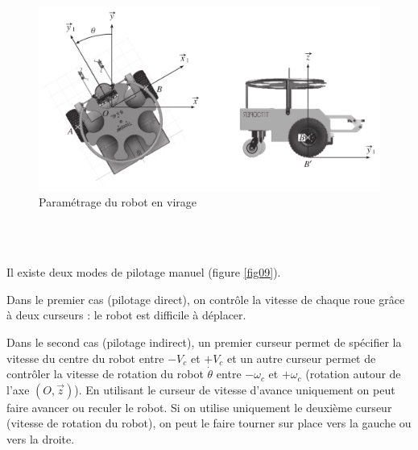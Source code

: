 \begin{figure}[ht!]
\begin{center}
 \includegraphics[width=0.7\linewidth]{img/fig08}
\end{center}
\caption{Paramétrage du robot en virage}
\label{fig08}
\end{figure}



~\ \\ ~\

Il existe deux modes de pilotage manuel (figure \ref{fig09}).

Dans le premier cas (pilotage direct), on contrôle la vitesse de chaque roue grâce à deux curseurs : le robot est difficile à déplacer.

Dans le second cas (pilotage indirect), un premier curseur permet de spécifier la vitesse du centre du robot entre $-V_c$ et $+V_c$ et un autre curseur permet de contrôler la vitesse de rotation du robot $\dot{\theta}$ entre $-\omega_c$ et $+\omega_c$ (rotation autour de l'axe $(O,\vec{z})$). En utilisant le curseur de vitesse d'avance uniquement on peut faire avancer ou reculer le robot. Si on utilise uniquement le deuxième curseur (vitesse de rotation du robot), on peut le faire tourner sur place vers la gauche ou vers la droite.

\newpage


